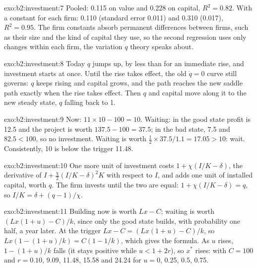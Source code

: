 \begin{solution}{exo:b2:investment:7}
Pooled: 0.115 on value and 0.228 on capital, $R^2 = 0.82$. With a constant for each firm: 0.110 (standard error 0.011) and 0.310 (0.017),
$R^2 = 0.95$. The firm constants absorb permanent differences between firms, such as their size and the kind of capital they
use, so the second regression uses only changes within each firm, the variation $q$ theory speaks about.
\end{solution}

\begin{solution}{exo:b2:investment:8}
Today $q$ jumps up, by less than for an immediate rise, and investment starts at once. Until the rise takes effect, the
old $\dot q = 0$ curve still governs: $q$ keeps rising and capital grows, and the path reaches the new saddle path exactly when the
rise takes effect. Then $q$ and capital move along it to the new steady state, $q$ falling back to 1.
\end{solution}

\begin{solution}{exo:b2:investment:9}
Now: $11 \times 10 - 100 = 10$. Waiting: in the good state profit is 12.5 and the project is worth $137.5 - 100 = 37.5$; in the bad state, 7.5 and $82.5 < 100$, so no
investment. Waiting is worth $\tfrac12 \times 37.5/1.1 = 17.05 > 10$: wait. Consistently, 10 is below the trigger 11.48.
\end{solution}

\begin{solution}{exo:b2:investment:10}
One more unit of investment costs $1 + \chi(I/K - \delta)$, the derivative of $I + \tfrac{\chi}{2}(I/K - \delta)^2K$ with respect to $I$, and adds one unit of installed capital, worth $q$. The firm
invests until the two are equal: $1 + \chi(I/K - \delta) = q$, so $I/K = \delta + (q - 1)/\chi$.
\end{solution}

\begin{solution}{exo:b2:investment:11}
Building now is worth $Lx - C$; waiting is worth $(Lx(1 + u) - C)/k$, since only the good state builds, with probability one half, a year later. At the
trigger $Lx - C = (Lx(1 + u) - C)/k$, so $Lx(1 - (1 + u)/k) = C(1 - 1/k)$, which gives the formula. As $u$ rises, $1 - (1 + u)/k$ falls (it stays positive while $u < 1 + 2r$), so $x^*$
rises: with $C = 100$ and $r = 0.10$, 9.09, 11.48, 15.58 and 24.24 for $u = 0$, 0.25, 0.5, 0.75.
\end{solution}

